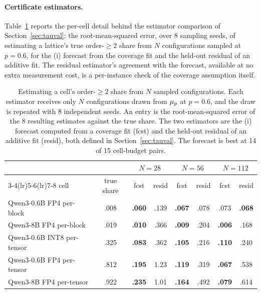 \paragraph{Certificate estimators.} Table~\ref{tab:certest} reports the per-cell detail behind the
estimator comparison of Section~\ref{sec:tauval}: the root-mean-squared error, over 8 sampling seeds,
of estimating a lattice's true order-$\ge 2$ share from $N$ configurations sampled at $p=0.6$, for the
\propfive(i) forecast from the coverage fit and the held-out residual of an additive fit. The residual
estimator's agreement with the forecast, available at no extra measurement cost, is a per-instance
check of the coverage assumption itself.

\begin{table}[t]
  \centering
  \footnotesize
  \begin{tabular}{lccccccc}
    \toprule
    & & \multicolumn{2}{c}{$N=28$} & \multicolumn{2}{c}{$N=56$} & \multicolumn{2}{c}{$N=112$} \\
    \cmidrule(lr){3-4}\cmidrule(lr){5-6}\cmidrule(lr){7-8}
    cell & true share & fcst & resid & fcst & resid & fcst & resid \\
    \midrule
    Qwen3-0.6B FP4 per-block  & .008 & \textbf{.060} & .139 & \textbf{.067} & .078 & .073 & \textbf{.068} \\
    Qwen3-8B FP4 per-block    & .019 & \textbf{.010} & .366 & \textbf{.009} & .204 & \textbf{.006} & .168 \\
    Qwen3-0.6B INT8 per-tensor & .325 & \textbf{.083} & .362 & \textbf{.105} & .216 & \textbf{.110} & .240 \\
    Qwen3-0.6B FP4 per-tensor & .812 & \textbf{.195} & 1.23 & \textbf{.119} & .319 & \textbf{.067} & .538 \\
    Qwen3-8B FP4 per-tensor   & .922 & \textbf{.235} & 1.01 & \textbf{.164} & .492 & \textbf{.079} & .614 \\
    \bottomrule
  \end{tabular}
  \caption{Estimating a cell's order-$\ge 2$ share from $N$ sampled configurations. Each estimator receives only
  $N$ configurations drawn from $\mu_p$ at $p=0.6$, and the draw is repeated with 8 independent seeds.
  An entry is the root-mean-squared error of the 8 resulting estimates against the true share. The two
  estimators are the \propfive(i) forecast computed from a coverage fit (fcst) and the held-out residual
  of an additive fit (resid), both defined in Section~\ref{sec:tauval}.
  The forecast is best at 14 of 15 cell-budget pairs. 
  }
  \label{tab:certest}
\end{table}

